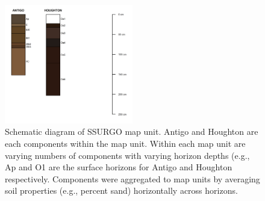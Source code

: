 \begin{figure}[h]
  \centering
    \includegraphics[width=0.5\textwidth]{./img/component_schematic.png}
	\caption[Schematic diagram of SSURGO map unit]{Schematic diagram of SSURGO map unit. Antigo and Houghton are each components within the map unit. Within each map unit are varying numbers of components with varying horizon depths (e.g., Ap and O1 are the surface horizons for Antigo and Houghton respectively. Components were aggregated to map units by averaging soil properties (e.g., percent sand) horizontally across horizons.}
	\label{fig:component_schematic}
\end{figure}

